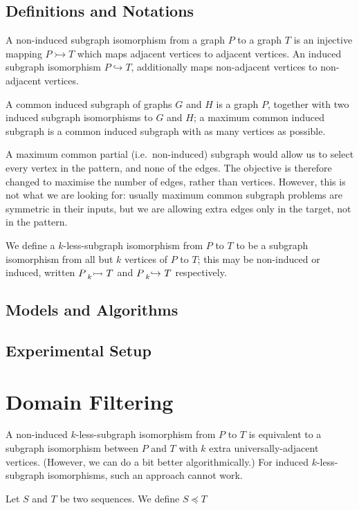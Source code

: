 \documentclass[letterpaper]{article}
\begin{document}
\subsection{Definitions and Notations}

A non-induced subgraph isomorphism from a graph $P$ to a graph $T$ is an injective mapping
$P \rightarrowtail T $ which maps adjacent vertices to adjacent vertices. An induced subgraph
isomorphism $P \hookrightarrow T$, additionally maps non-adjacent vertices to non-adjacent
 vertices.

A common induced subgraph of graphs $G$ and $H$ is a graph $P$, together with two induced subgraph
isomorphisms to $G$ and $H$; a maximum common induced subgraph is a common induced subgraph with as
many vertices as possible.

A maximum common partial (i.e.\ non-induced) subgraph would allow us to select every vertex in the
pattern, and none of the edges. The objective is therefore changed to maximise the number of edges,
rather than vertices. However, this is not what we are looking for: usually maximum common subgraph
problems are symmetric in their inputs, but we are allowing extra edges only in the target, not in
the pattern.

We define a $k$-less-subgraph isomorphism from $P$ to $T$ to be a subgraph isomorphism from all
but $k$ vertices of $P$ to $T$; this may be non-induced or induced, written
$P \prescript{}{k}{\rightarrowtail}\  T$ and $P \prescript{}{k}{\hookrightarrow}\  T$ respectively.

\subsection{Models and Algorithms}

\subsection{Experimental Setup}

\section{Domain Filtering}

A non-induced $k$-less-subgraph isomorphism from $P$ to $T$ is equivalent to a subgraph
isomorphism between $P$ and $T$ with $k$ extra universally-adjacent vertices. (However, we can do a
bit better algorithmically.) For induced $k$-less-subgraph isomorphisms, such an approach cannot
work.

Let $S$ and $T$ be two sequences. We define $S \preceq T$
\end{document}
